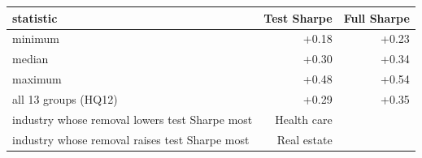 \begin{tabular}{lrr}
\toprule
statistic & Test Sharpe & Full Sharpe \\
\midrule
minimum & +0.18 & +0.23 \\
median & +0.30 & +0.34 \\
maximum & +0.48 & +0.54 \\
all 13 groups (HQ12) & +0.29 & +0.35 \\
industry whose removal lowers test Sharpe most & Health care &  \\
industry whose removal raises test Sharpe most & Real estate &  \\
\bottomrule
\end{tabular}
